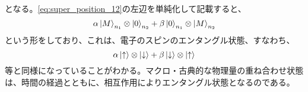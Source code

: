 となる。\eqref{eq:super_position_12}の左辺を単純化して記載すると、
\begin{equation}
    \alpha \ket{M}_{n_1} \otimes \ket{0}_{n_2} + \beta \ket{0}_{n_1} \otimes \ket{M}_{n_2}
\end{equation}
という形をしており、これは、電子のスピンのエンタングル状態、すなわち、
\begin{equation}
    \alpha \ket{\uparrow} \otimes \ket{\downarrow} + \beta \ket{\downarrow} \otimes \ket{\uparrow}
\end{equation}
等と同様になっていることがわかる。マクロ・古典的な物理量の重ね合わせ状態は、時間の経過とともに、相互作用によりエンタングル状態となるのである。
